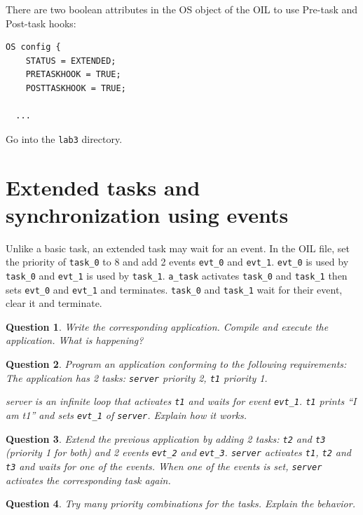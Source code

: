 \documentclass[11pt]{article}
\newtheorem{ex}{Question}
\begin{document}
There are two boolean attributes in the OS object of the OIL to use Pre-task and Post-task hooks:

\begin{lstlisting}[language=OIL]
  OS config {
    STATUS = EXTENDED;
    PRETASKHOOK = TRUE;
    POSTTASKHOOK = TRUE;
    
  ...
\end{lstlisting}

Go into the \texttt{lab3} directory. 

\section{Extended tasks and synchronization using events}

Unlike a basic task, an extended task may wait for an event. In the OIL file, set the priority of \texttt{task_0} to 8 and add 2 events \texttt{evt_0} and \texttt{evt_1}. \texttt{evt_0} is used by \texttt{task_0} and \texttt{evt_1} is used by \texttt{task_1}. \texttt{a_task} activates \texttt{task_0} and \texttt{task_1} then sets \texttt{evt_0} and \texttt{evt_1} and terminates. \texttt{task_0} and \texttt{task_1} wait for their event, clear it and terminate.

\begin{ex}
Write the corresponding application. Compile and execute the application. What is happening?
\end{ex}

\begin{ex}
Program an application conforming to the following requirements: The application has 2 tasks:
\texttt{server} priority 2, \texttt{t1} priority 1.

server is an infinite loop that activates \texttt{t1} and waits for event \texttt{evt_1}. \texttt{t1} prints ``I am t1'' and sets \texttt{evt_1} of \texttt{server}. Explain how it works.
\end{ex}

\begin{ex}
Extend the previous application by adding 2 tasks: \texttt{t2} and \texttt{t3} (priority 1 for both) and 2 events \texttt{evt_2} and \texttt{evt_3}. \texttt{server} activates \texttt{t1}, \texttt{t2} and \texttt{t3} and waits for one of the events. When one of the events is set, \texttt{server} activates the corresponding task again.
\end{ex}

\begin{ex}
Try many priority combinations for the tasks. Explain the behavior.
\end{ex}
\end{document}

